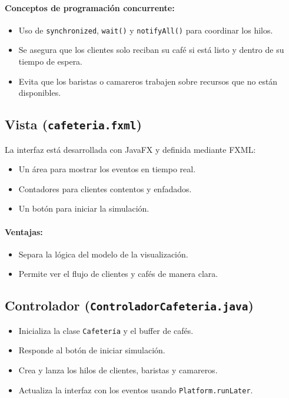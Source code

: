 \documentclass[12pt,a4paper]{article}
\begin{document}
\paragraph{Conceptos de programación concurrente:}
\begin{itemize}
    \item Uso de \texttt{synchronized}, \texttt{wait()} y \texttt{notifyAll()} para coordinar los hilos.
    \item Se asegura que los clientes solo reciban su café si está listo y dentro de su tiempo de espera.
    \item Evita que los baristas o camareros trabajen sobre recursos que no están disponibles.
\end{itemize}


\subsection{Vista (\texttt{cafeteria.fxml})}

La interfaz está desarrollada con JavaFX y definida mediante FXML:

\begin{itemize}
    \item Un área para mostrar los eventos en tiempo real.
    \item Contadores para clientes contentos y enfadados.
    \item Un botón para iniciar la simulación.
\end{itemize}

\paragraph{Ventajas:}
\begin{itemize}
    \item Separa la lógica del modelo de la visualización.
    \item Permite ver el flujo de clientes y cafés de manera clara.
\end{itemize}


\subsection{Controlador (\texttt{ControladorCafeteria.java})}

\begin{itemize}
    \item Inicializa la clase \texttt{Cafetería} y el buffer de cafés.
    \item Responde al botón de iniciar simulación.
    \item Crea y lanza los hilos de clientes, baristas y camareros.
    \item Actualiza la interfaz con los eventos usando \texttt{Platform.runLater}.
\end{itemize}
\end{document}
